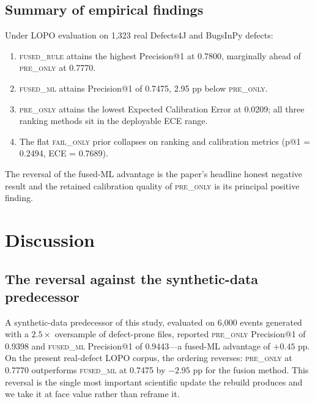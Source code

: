 \documentclass[preprint,12pt]{elsarticle}
\begin{document}
\subsection{Summary of empirical findings}

Under LOPO evaluation on 1{,}323 real Defects4J and BugsInPy defects:
\begin{enumerate}
\item \textsc{fused\_rule} attains the highest Precision@1 at 0.7800, marginally ahead of \textsc{pre\_only} at 0.7770.
\item \textsc{fused\_ml} attains Precision@1 of 0.7475, 2.95 pp below \textsc{pre\_only}.
\item \textsc{pre\_only} attains the lowest Expected Calibration Error at 0.0209; all three ranking methods sit in the deployable ECE range.
\item The flat \textsc{fail\_only} prior collapses on ranking and calibration metrics (p@1 = 0.2494, ECE = 0.7689).
\end{enumerate}
The reversal of the fused-ML advantage is the paper's headline honest negative result and the retained calibration quality of \textsc{pre\_only} is its principal positive finding.

\section{Discussion}
\label{sec:discussion}

\subsection{The reversal against the synthetic-data predecessor}

A synthetic-data predecessor of this study, evaluated on 6{,}000 events generated with a $2.5\times$ oversample of defect-prone files, reported \textsc{pre\_only} Precision@1 of 0.9398 and \textsc{fused\_ml} Precision@1 of 0.9443---a fused-ML advantage of $+0.45$ pp. On the present real-defect LOPO corpus, the ordering reverses: \textsc{pre\_only} at 0.7770 outperforms \textsc{fused\_ml} at 0.7475 by $-2.95$ pp for the fusion method. This reversal is the single most important scientific update the rebuild produces and we take it at face value rather than reframe it.
\end{document}
